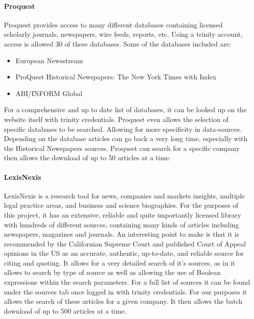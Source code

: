 \paragraph{Proquest}

Proquest\cite{proquest} provides access to many different databases containing licensed scholarly journals, newspapers, wire feeds, reports, etc. Using a trinity account, access is allowed 30 of these databases. Some of the databases included are:
\begin{itemize}
    \item European Newsstream
    \item ProQuest Historical Newspapers: The New York Times with Index
    \item ABI/INFORM Global‎
\end{itemize}
For a comprehensive and up to date list of databases, it can be looked up on the website itself with trinity credentials. Proquest even allows the selection of specific databases to be searched. Allowing for more specificity in data-sources. Depending on the database articles can go back a very long time, especially with the Historical Newspapers sources. Proquest can search for a specific company then allows the download of up to 50 articles at a time.

\paragraph{LexisNexis}

LexisNexis\cite{lexisnexis} is a research tool for news, companies and markets insights, multiple legal practice areas, and business and science biographies. For the purposes of this project, it has an extensive, reliable and quite importantly licensed library with hundreds of different sources, containing many kinds of articles including newspapers, magazines and journals. An interesting point to make is that it is recommended by the Californian Supreme Court and published Court of Appeal opinions in the US as an accurate, authentic, up-to-date, and reliable source for citing and quoting. It allows for a very detailed search of it's sources, as in it allows to search by type of source as well as allowing the use of Boolean expressions within the search parameters. For a full list of sources it can be found under the sources tab once logged in with trinity credentials. For our purposes it allows the search of these articles for a given company. It then allows the batch download of up to 500 articles at a time.

